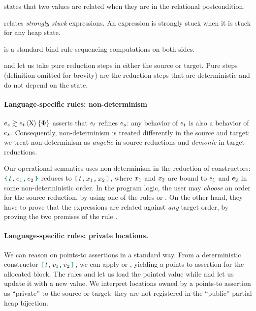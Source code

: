  states that two values are related when they are in the relational postcondition.

 relates \emph{strongly stuck} expressions.
An expression is strongly stuck when it is stuck for any heap state.

 is a standard bind rule sequencing computations on both sides.

 and  let us take pure reduction steps in either the source or target.
Pure steps (definition omitted for brevity) are the reduction steps that are deterministic and do not depend on the state.

\paragraph{Language-specific rules: non-determinism}
$\iSimv[\iProt]{\iPred}{\datalangExpr_s}{\datalangExpr_t}$ asserts that $\datalangExpr_t$ refines $\datalangExpr_s$: any behavior of $\datalangExpr_t$ is also a behavior of $\datalangExpr_s$.
Consequently, non-determinism is treated differently in the source and target: we treat non-determinism as \emph{angelic} in source reductions and \emph{demonic} in target reductions.

Our operational semantics uses non-determinism in the reduction of constructors: $\datalangBlock{\datalangTag}{\datalangExpr_1}{\datalangExpr_2}$ reduces to $\datalangBlockDet{\datalangTag}{\datalangVar_1}{\datalangVar_2}$, where $\datalangVar_1$ and $\datalangVar_2$ are bound to $\datalangExpr_1$ and $\datalangExpr_2$ in some non-deterministic order.
In the program logic, the user may \emph{choose} an order for the source reduction, by using one of the rules  or . On the other hand, they have to prove that the expressions are related against \emph{any} target order, by proving the two premises of the rule .

\paragraph{Language-specific rules: private locations.}
We can reason on points-to assertions in a standard way.
From a deterministic constructor $\datalangBlockDet{\datalangTag}{\datalangVal_1}{\datalangVal_2}$, we can apply  or , yielding a points-to assertion for the allocated block.
The rules  and  let us load the pointed value while  and  let us update it with a new value.
We interpret locations owned by a points-to assertion as ``private'' to the source or target: they are not registered in the ``public'' partial heap bijection.

